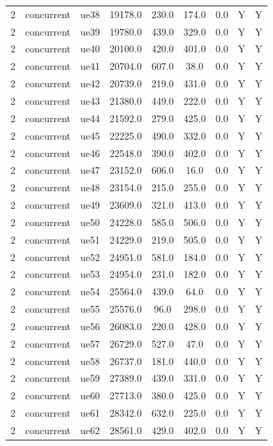 \begin{table}[ht]
\begin{tabular}{|c|c|c|c|c|c|c|c|c|}
2 & concurrent & ue38 & 19178.0 & 230.0 & 174.0 & 0.0 & Y & Y \\
2 & concurrent & ue39 & 19780.0 & 439.0 & 329.0 & 0.0 & Y & Y \\
2 & concurrent & ue40 & 20100.0 & 420.0 & 401.0 & 0.0 & Y & Y \\
2 & concurrent & ue41 & 20704.0 & 607.0 & 38.0 & 0.0 & Y & Y \\
2 & concurrent & ue42 & 20739.0 & 219.0 & 431.0 & 0.0 & Y & Y \\
2 & concurrent & ue43 & 21380.0 & 449.0 & 222.0 & 0.0 & Y & Y \\
2 & concurrent & ue44 & 21592.0 & 279.0 & 425.0 & 0.0 & Y & Y \\
2 & concurrent & ue45 & 22225.0 & 490.0 & 332.0 & 0.0 & Y & Y \\
2 & concurrent & ue46 & 22548.0 & 390.0 & 402.0 & 0.0 & Y & Y \\
2 & concurrent & ue47 & 23152.0 & 606.0 & 16.0 & 0.0 & Y & Y \\
2 & concurrent & ue48 & 23154.0 & 215.0 & 255.0 & 0.0 & Y & Y \\
2 & concurrent & ue49 & 23609.0 & 321.0 & 413.0 & 0.0 & Y & Y \\
2 & concurrent & ue50 & 24228.0 & 585.0 & 506.0 & 0.0 & Y & Y \\
2 & concurrent & ue51 & 24229.0 & 219.0 & 505.0 & 0.0 & Y & Y \\
2 & concurrent & ue52 & 24951.0 & 581.0 & 184.0 & 0.0 & Y & Y \\
2 & concurrent & ue53 & 24954.0 & 231.0 & 182.0 & 0.0 & Y & Y \\
2 & concurrent & ue54 & 25564.0 & 439.0 & 64.0 & 0.0 & Y & Y \\
2 & concurrent & ue55 & 25576.0 & 96.0 & 298.0 & 0.0 & Y & Y \\
2 & concurrent & ue56 & 26083.0 & 220.0 & 428.0 & 0.0 & Y & Y \\
2 & concurrent & ue57 & 26729.0 & 527.0 & 47.0 & 0.0 & Y & Y \\
2 & concurrent & ue58 & 26737.0 & 181.0 & 440.0 & 0.0 & Y & Y \\
2 & concurrent & ue59 & 27389.0 & 439.0 & 331.0 & 0.0 & Y & Y \\
2 & concurrent & ue60 & 27713.0 & 380.0 & 425.0 & 0.0 & Y & Y \\
2 & concurrent & ue61 & 28342.0 & 632.0 & 225.0 & 0.0 & Y & Y \\
2 & concurrent & ue62 & 28561.0 & 429.0 & 402.0 & 0.0 & Y & Y \\

\end{tabular}
\end{table}
